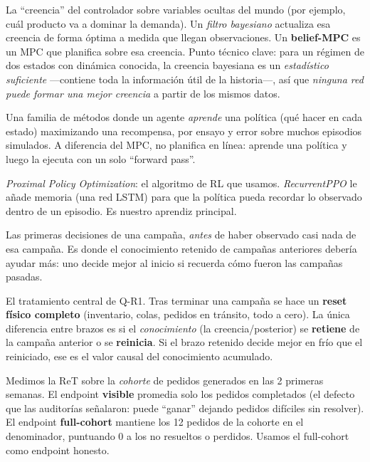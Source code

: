 \documentclass[11pt,a4paper]{article}
\begin{document}
\begin{description}[style=unboxed,leftmargin=0pt]
\item[\emph{belief} / filtro bayesiano.]
La ``creencia'' del controlador sobre variables ocultas del mundo (por ejemplo, cuál producto va a
dominar la demanda). Un \emph{filtro bayesiano} actualiza esa creencia de forma óptima a medida que
llegan observaciones. Un \textbf{belief-MPC} es un MPC que planifica sobre esa creencia. Punto técnico
clave: para un régimen de dos estados con dinámica conocida, la creencia bayesiana es un
\emph{estadístico suficiente} —contiene toda la información útil de la historia—, así que \emph{ninguna
red puede formar una mejor creencia} a partir de los mismos datos.

\item[Aprendizaje por refuerzo (RL, \emph{Reinforcement Learning}).]
Una familia de métodos donde un agente \emph{aprende} una política (qué hacer en cada estado)
maximizando una recompensa, por ensayo y error sobre muchos episodios simulados. A diferencia del MPC,
no planifica en línea: aprende una política y luego la ejecuta con un solo ``forward pass''.

\item[PPO / RecurrentPPO.]
\emph{Proximal Policy Optimization}: el algoritmo de RL que usamos. \emph{RecurrentPPO} le añade
memoria (una red LSTM) para que la política pueda recordar lo observado dentro de un episodio. Es
nuestro aprendiz principal.

\item[\emph{cold-start} (arranque en frío).]
Las primeras decisiones de una campaña, \emph{antes} de haber observado casi nada de esa campaña. Es
donde el conocimiento retenido de campañas anteriores debería ayudar más: uno decide mejor al inicio
si recuerda cómo fueron las campañas pasadas.

\item[\emph{retained} vs \emph{reset} (retenido vs reiniciado).]
El tratamiento central de Q-R1. Tras terminar una campaña se hace un \textbf{reset físico completo}
(inventario, colas, pedidos en tránsito, todo a cero). La única diferencia entre brazos es si el
\emph{conocimiento} (la creencia/posterior) se \textbf{retiene} de la campaña anterior o se
\textbf{reinicia}. Si el brazo retenido decide mejor en frío que el reiniciado, ese es el valor causal
del conocimiento acumulado.

\item[Cohorte temprana y \emph{full-cohort} vs \emph{visible}.]
Medimos la ReT sobre la \emph{cohorte} de pedidos generados en las 2 primeras semanas. El endpoint
\textbf{visible} promedia solo los pedidos completados (el defecto que las auditorías señalaron: puede
``ganar'' dejando pedidos difíciles sin resolver). El endpoint \textbf{full-cohort} mantiene los 12
pedidos de la cohorte en el denominador, puntuando 0 a los no resueltos o perdidos. Usamos el
full-cohort como endpoint honesto.


\end{description}
\end{document}
